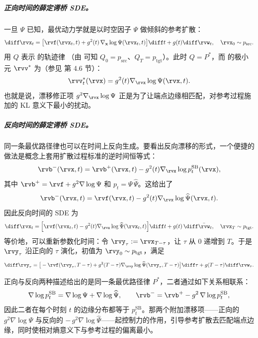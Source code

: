 \subparagraph{正向时间的薛定谔桥 SDE。}
一旦 $\Psi$ 已知，最优动力学就是以时空因子 $\Psi$ 做倾斜的参考扩散：
\begin{align}\label{eq:sb-forward-sde}
    \diff \rvx_t = \bigl[\rvf(\rvx_t, t) + g^2(t)\,\nabla_{\mathbf{x}} \log \Psi(\rvx_t, t)\bigr]\diff t
+ g(t)\diff \rvw_t, \quad \rvx_0 \sim p_{\mathrm{src}}.
\end{align}
用 $Q$ 表示  的轨迹律
（由  可知 $Q_0=p_{\mathrm{src}}$、$Q_T=p_{\mathrm{tgt}}$）。此时
\emph{$Q=P^*$}，而  的极小元 $\rvv^*$ 为（参见 \citet{chen2021stochastic} 第 4.6 节）：
\[
\rvv_t^{*}(\rvx) = g^2(t) \nabla_\rvx \log \Psi(\rvx,t).
\]
也就是说，漂移修正项 $g^2\nabla_\rvx\log\Psi$ 正是为了让端点边缘相匹配，对参考过程施加的 KL 意义下最小的扰动。


\subparagraph{反向时间的薛定谔桥 SDE。}
同一条最优路径律也可以在时间上反向生成。要看出反向漂移的形式，一个便捷的做法是概念上套用扩散过程标准的逆时间恒等式：
\[
\rvb^{-}(\rvx,t)=\rvb^{+}(\rvx,t)-g^2(t)\nabla_\rvx\log p_t^{\mathrm{SB}}(\rvx),
\]
其中 $\rvb^{+}=\rvf+g^2\nabla\log\Psi$ 和 $p_t=\Psi\,\widehat{\Psi}$。这给出了
\[
\rvb^{-}(\rvx,t)=\rvf(\rvx,t)-g^2(t) \nabla_\rvx\log \widehat{\Psi}(\rvx,t).
\]
因此反向时间的 SDE 为
\begin{align}\label{eq:sb-backward-sde}
\diff \rvx_t
= \Big[\rvf(\rvx_t,t) - g^2(t) \nabla_{\rvx}\log \widehat{\Psi}(\rvx_t,t)\Big]\diff t
+ g(t)\,\diff \bar{\rvw}_t, \quad \rvx_T \sim p_{\mathrm{tgt}} .
\end{align}
等价地，可以重新参数化时间：令 $\rvy_\tau := \rvx_{T-\tau}$，让
$\tau$ 从 $0$ 递增到 $T$。于是 $\rvy_\tau$ 沿正向的 $\tau$ 演化，初值为 $\rvy_0 \sim p_{\mathrm{tgt}}$，满足
\begin{align}\label{eq:sb-reverse-forward-tau}
\begin{aligned}
    \diff \rvy_\tau
= \big[-\rvf(\rvy_\tau,T-\tau) + g^2(T-\tau) \nabla_{\rvy}\log \widehat{\Psi}(\rvy_\tau,T-\tau)\big]\diff \tau
+ g(T-\tau) \diff \rvw_\tau.
\end{aligned}
\end{align}


正向与反向两种描述给出的是同一条最优路径律 $P^*$，二者通过如下关系相联系：
\[
\nabla\log p_t^{\mathrm{SB}}=\nabla\log\Psi+\nabla\log\widehat\Psi,
\qquad
\rvb^{-}=\rvb^{+}-g^2\,\nabla\log p_t^{\mathrm{SB}},
\]
因此二者在每个时刻 $t$ 的边缘分布都等于 $p_t^{\mathrm{SB}}$。那两个附加漂移项——正向的 $g^2\nabla\log\Psi$ 与反向的 $-\,g^2\nabla\log\widehat{\Psi}$——起控制力的作用，引导参考扩散去匹配端点边缘，同时使相对熵意义下与参考过程的偏离最小。


